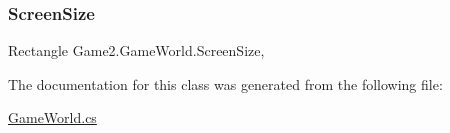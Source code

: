 \mbox{\label{class_game2_1_1_game_world_a33e4b367438dde0cb88d9fab8439c0e5}} 
\subsubsection{\texorpdfstring{Screen\+Size}{ScreenSize}}
{\footnotesize\ttfamily Rectangle Game2.\+Game\+World.\+Screen\+Size\hspace{0.3cm}{\ttfamily [static]}, {\ttfamily [get]}}



The documentation for this class was generated from the following file\+:\begin{DoxyCompactItemize}
\item 
\mbox{\hyperlink{_game_world_8cs}{Game\+World.\+cs}}\end{DoxyCompactItemize}
